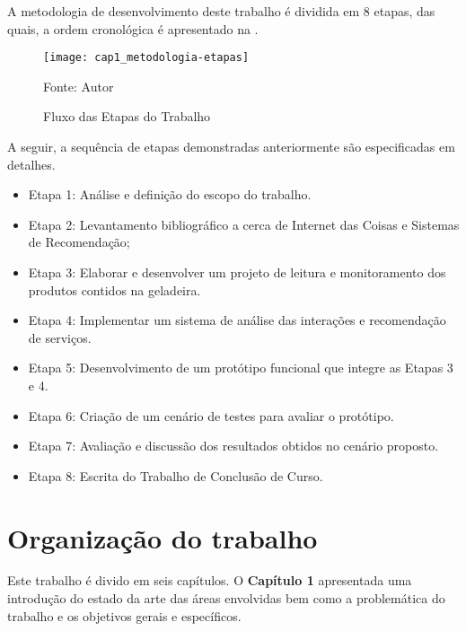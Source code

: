 A metodologia de desenvolvimento deste trabalho é dividida em 8 etapas, das quais, a ordem cronológica é apresentado na .

\begin{figure}[hb]
    
    \caption{Fluxo das Etapas do Trabalho}
    \texttt{[image: cap1\_metodologia-etapas]}
    \label{fig:cap1_metodologia-etapas}
    
    Fonte: Autor
\end{figure}

A seguir, a sequência de etapas demonstradas anteriormente são especificadas em detalhes.

\begin{itemize}\parskip -1pt
    \item Etapa 1: Análise e definição do escopo do trabalho.
	\item Etapa 2: Levantamento bibliográfico a cerca de Internet das Coisas e Sistemas de Recomendação;
	\item Etapa 3: Elaborar e desenvolver um projeto de leitura e monitoramento dos produtos contidos na geladeira.
	\item Etapa 4: Implementar um sistema de análise das interações e recomendação de serviços.
	\item Etapa 5: Desenvolvimento de um protótipo funcional que integre as Etapas 3 e 4.
	\item Etapa 6: Criação de um cenário de testes para avaliar o protótipo.
	\item Etapa 7: Avaliação e discussão dos resultados obtidos no cenário proposto.
	\item Etapa 8: Escrita do Trabalho de Conclusão de Curso.
\end{itemize}




\section{Organização do trabalho} %

Este trabalho é divido em seis capítulos. O \textbf{Capítulo 1} apresentada uma introdução do estado da arte das áreas envolvidas bem como a problemática do trabalho e os objetivos gerais e específicos.

